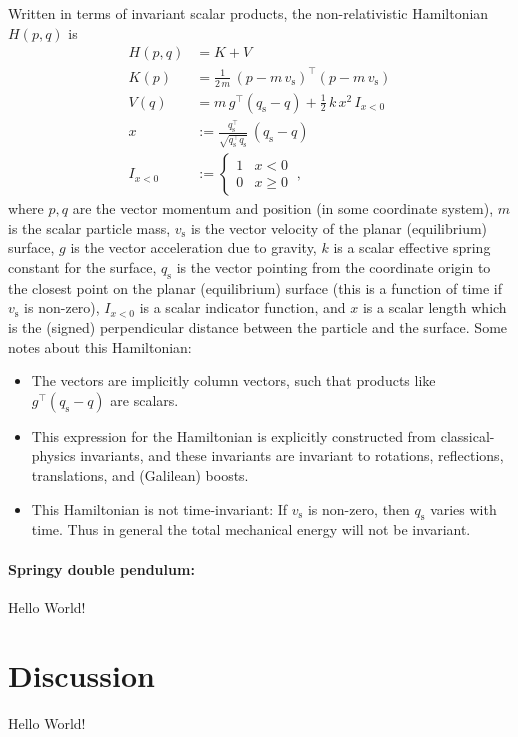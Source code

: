 \documentclass[12pt]{article}
\newcommand{\T}{^\top}
\newcommand{\surf}{{\mathrm{s}}}
\begin{document}
Written in terms of invariant scalar products, the non-relativistic Hamiltonian $H(p,q)$ is
\begin{align}
    H(p,q) &= K + V \\
    K(p) &= \frac{1}{2\,m}\,(p - m\,v_\surf)\T (p - m\,v_\surf) \\
    V(q) &= m\,g\T (q_\surf - q) + \frac{1}{2}\,k\,x^2\,I_{x<0} \\
    x &:= \frac{q_\surf\T}{\sqrt{q_\surf\T q_\surf}}\,(q_\surf - q) \\
    I_{x<0} &:= \left\{\begin{array}{cl} 1 & x < 0 \\ 0 & x \geq 0\end{array}\right. ~,
\end{align}
where $p,q$ are the vector momentum and position (in some coordinate system), $m$ is the scalar particle mass, $v_\surf$ is the vector velocity of the planar (equilibrium) surface, $g$ is the vector acceleration due to gravity, $k$ is a scalar effective spring constant for the surface, $q_\surf$ is the vector pointing from the coordinate origin to the closest point on the planar (equilibrium) surface (this is a function of time if $v_\surf$ is non-zero), $I_{x<0}$ is a scalar indicator function, and $x$ is a scalar length which is the (signed) perpendicular distance between the particle and the surface.
Some notes about this Hamiltonian:
\begin{itemize}
  \item The vectors are implicitly column vectors, such that products like $g\T (q_\surf - q)$ are scalars.
  \item This expression for the Hamiltonian is explicitly constructed from classical-physics invariants, and these invariants are invariant to rotations, reflections, translations, and (Galilean) boosts.
  \item This Hamiltonian is not time-invariant: If $v_\surf$ is non-zero, then $q_\surf$ varies with time. Thus in general the total mechanical energy will not be invariant.
\end{itemize}

\paragraph{Springy double pendulum:}
Hello World!

\section{Discussion}

Hello World!
\end{document}
